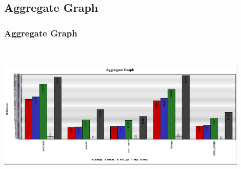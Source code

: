 \documentclass[12pt]{beamer}
\begin{document}
\subsection{Aggregate Graph}
\begin{frame}[c]
\frametitle{Aggregate Graph}
\centering
   \includegraphics[width=12cm, height=7cm]{images/aggregategraph}

\end{frame}

\end{document}
